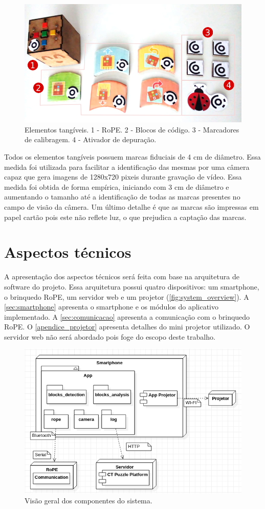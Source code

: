 \begin{figure}[!h]
\centering
        \includegraphics[width=.9\linewidth,fbox]{figs/tangible_elements.png}
        \caption{Elementos tangíveis. 1 - RoPE. 2 - Blocos de código. 3 - Marcadores de calibragem. 4 - Ativador de depuração.}
        \label{fig:tangible_elements}
\end{figure}
Todos os elementos tangíveis possuem marcas fiduciais de 4 cm de diâmetro. Essa medida foi utilizada para facilitar a identificação das mesmas por uma câmera capaz que gera imagens de 1280x720 pixeis durante gravação de vídeo. Essa medida foi obtida de forma empírica, iniciando com 3 cm de diâmetro e aumentando o tamanho até a identificação de todas as marcas presentes no campo de visão da câmera. Um último detalhe é que as marcas são impressas em papel cartão pois este não reflete luz, o que prejudica a captação das marcas.

\section{Aspectos técnicos}
\label{sec:detalhes_tecnicos}
A apresentação dos aspectos técnicos será feita com base na arquitetura de software do projeto. Essa arquitetura possui quatro dispositivos: um smartphone, o brinquedo RoPE, um servidor web e um projetor (\autoref{fig:system_overview}).  A \autoref{sec:smartphone} apresenta o smartphone e os módulos do aplicativo implementado. A \autoref{sec:comunicacao} apresenta a comunicação com o brinquedo RoPE. O \autoref{apendice_projetor} apresenta detalhes do mini projetor utilizado. O servidor web não será abordado pois foge do escopo deste trabalho.

\begin{figure}[!h]
    \centering
    \includegraphics[width=.8\linewidth,fbox]{figs/system_overview.png}
    \caption{Visão geral dos componentes do sistema.}
    \label{fig:system_overview}
\end{figure}

